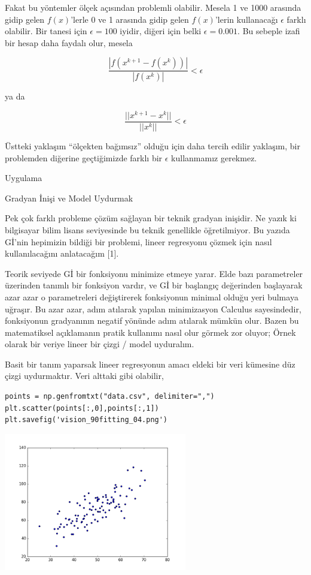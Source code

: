 \documentclass[12pt,fleqn]{article}\usepackage{../../common}
\begin{document}
Fakat bu yöntemler ölçek açısından problemli olabilir. Mesela 1 ve 1000
arasında gidip gelen $f(x)$'lerle 0 ve 1 arasında gidip gelen $f(x)$'lerin
kullanacağı $\epsilon$ farklı olabilir. Bir tanesi için $\epsilon = 100$
iyidir, diğeri için belki $\epsilon = 0.001$. Bu sebeple izafi bir hesap
daha faydalı olur, mesela

$$
\frac{|f(x^{k+1} - f(x^k))|}{|f(x^k)|} < \epsilon
$$

ya da 

$$
\frac{||x^{k+1} - x^k||}{||x^k||} < \epsilon
$$


Üstteki yaklaşım ``ölçekten bağımsız'' olduğu için daha tercih edilir
yaklaşım, bir problemden diğerine geçtiğimizde farklı bir $\epsilon$
kullanmamız gerekmez.

Uygulama

Gradyan İnişi ve Model Uydurmak

Pek çok farklı probleme çözüm sağlayan bir teknik gradyan inişidir. Ne yazık ki
bilgisayar bilim lisans seviyesinde bu teknik genellikle öğretilmiyor. Bu yazıda
Gİ'nin hepimizin bildiği bir problemi, lineer regresyonu çözmek için nasıl
kullanılacağını anlatacağım [1].

Teorik seviyede Gİ bir fonksiyonu minimize etmeye yarar. Elde bazı parametreler
üzerinden tanımlı bir fonksiyon vardır, ve Gİ bir başlangıç değerinden
başlayarak azar azar o parametreleri değiştirerek fonksiyonun minimal olduğu
yeri bulmaya uğraşır. Bu azar azar, adım atılarak yapılan minimizasyon Calculus
sayesindedir, fonksiyonun gradyanının negatif yönünde adım atılarak mümkün
olur. Bazen bu matematiksel açıklamanın pratik kullanımı nasıl olur görmek zor
oluyor; Örnek olarak bir veriye lineer bir çizgi / model uyduralım.

Basit bir tanım yaparsak lineer regresyonun amacı eldeki bir veri kümesine düz
çizgi uydurmaktır. Veri alttaki gibi olabilir,

\begin{verbatim}
points = np.genfromtxt("data.csv", delimiter=",")
plt.scatter(points[:,0],points[:,1])
plt.savefig('vision_90fitting_04.png')
\end{verbatim}

\includegraphics[height=6cm]{vision_90fitting_04.png}
\end{document}
